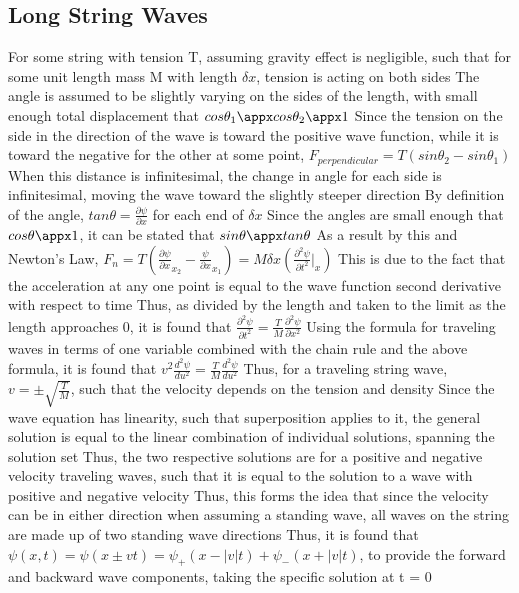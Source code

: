 \documentclass[11 pt, twoside]{article}
\newenvironment{outline*}
{
	\begin{outline}[enumerate]
	}
	{\end{outline}
}
\begin{document}
\subsection{Long String Waves}
\begin{outline*}
\1 For some string with tension T, assuming gravity effect is negligible, such that for some unit length mass M with length $\delta x$, tension is acting on both sides
\2 The angle is assumed to be slightly varying on the sides of the length, with small enough total displacement that $cos\theta_1 \appx cos\theta_2 \appx 1$
\3 Since the tension on the side in the direction of the wave is toward the positive wave function, while it is toward the negative for the other at some point, $F_{perpendicular} = T(sin\theta_2 - sin\theta_1)$
\3 When this distance is infinitesimal, the change in angle for each side is infinitesimal, moving the wave toward the slightly steeper direction
\2 By definition of the angle, $tan\theta = \frac{\partial \psi}{\partial x}$ for each end of $\delta x$
\3 Since the angles are small enough that $cos\theta \appx 1$, it can be stated that $sin\theta \appx tan\theta$
\3 As a result by this and Newton's Law, $F_n = T(\frac{\partial \psi}{\partial x}_{x_2} - \frac{\psi}{\partial x}_{x_1}) = M\delta x (\frac{\partial^2 \psi}{\partial t^2}|_x)$
\4 This is due to the fact that the acceleration at any one point is equal to the wave function second derivative with respect to time
\3 Thus, as divided by the length and taken to the limit as the length approaches 0, it is found that $\frac{\partial^2 \psi}{\partial t^2} = \frac{T}{M}\frac{\partial^2 \psi}{\partial x^2}$
\1 Using the formula for traveling waves in terms of one variable combined with the chain rule and the above formula, it is found that $v^2 \frac{d^2 \psi}{du^2} = \frac{T}{M} \frac{d^2 \psi}{du^2}$
\2 Thus, for a traveling string wave, $v = \pm \sqrt{\frac{T}{M}}$, such that the velocity depends on the tension and density
\1 Since the wave equation has linearity, such that superposition applies to it, the general solution is equal to the linear combination of individual solutions, spanning the solution set
\2 Thus, the two respective solutions are for a positive and negative velocity traveling waves, such that it is equal to the solution to a wave with positive and negative velocity
\3 Thus, this forms the idea that since the velocity can be in either direction when assuming a standing wave, all waves on the string are made up of two standing wave directions
\2 Thus, it is found that $\psi(x, t) = \psi(x \pm vt) = \psi_+(x - |v|t) + \psi_-(x + |v|t)$, to provide the forward and backward wave components, taking the specific solution at t = 0

\end{outline*}
\end{document}
